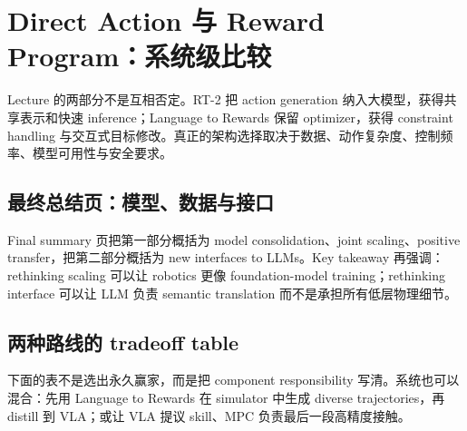 \section{Direct Action 与 Reward Program：系统级比较}

Lecture 的两部分不是互相否定。RT-2 把 action generation 纳入大模型，获得共享表示和快速 inference；Language to Rewards 保留 optimizer，获得 constraint handling 与交互式目标修改。真正的架构选择取决于数据、动作复杂度、控制频率、模型可用性与安全要求。

\subsection{最终总结页：模型、数据与接口}

Final summary 页把第一部分概括为 model consolidation、joint scaling、positive transfer，把第二部分概括为 new interfaces to LLMs。Key takeaway 再强调：rethinking scaling 可以让 robotics 更像 foundation-model training；rethinking interface 可以让 LLM 负责 semantic translation 而不是承担所有低层物理细节。



\subsection{两种路线的 tradeoff table}

下面的表不是选出永久赢家，而是把 component responsibility 写清。系统也可以混合：先用 Language to Rewards 在 simulator 中生成 diverse trajectories，再 distill 到 VLA；或让 VLA 提议 skill、MPC 负责最后一段高精度接触。

